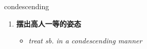 
\begin{frame}
{\huge condescending}
\begin{center}
\begin{enumerate}\Large
  \item \textbf{摆出高人一等的姿态}
  \begin{itemize}
    \item \em{\Large{treat sb. in a condescending manner}}
  \end{itemize}
\end{enumerate}
\end{center}
\end{frame}

